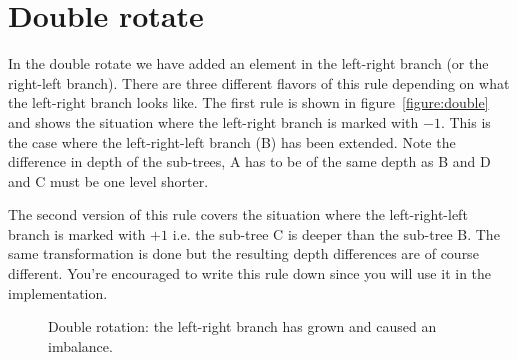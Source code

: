 \documentclass[a4paper,11pt]{article}
\begin{document}

\section{Double rotate}

In the double rotate we have added an element in the left-right branch
(or the right-left branch). There are three different flavors of this
rule depending on what the left-right branch looks like. The first
rule is shown in figure~\ref{figure:double} and shows the situation
where the left-right branch is marked with $-1$. This is the case where
the left-right-left branch (B) has been extended. Note the difference
in depth of the sub-trees, A has to be of the same depth as B and D
and C must be one level shorter.

The second version of this rule covers the situation where the
left-right-left branch is marked with $+1$ i.e. the sub-tree C is deeper
than the sub-tree B. The same transformation is done but the resulting
depth differences are of course different. You're encouraged to write
this rule down since you will use it in the implementation.

\begin{figure}[h!]
    

\caption{Double rotation: the left-right branch has grown and caused an imbalance. \label{fig:double}}
\end{figure}
\end{document}
